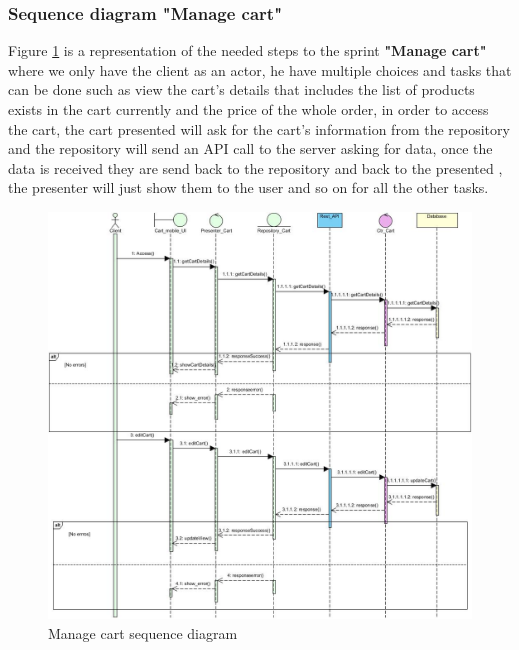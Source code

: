 \documentclass[12pt,a4paper]{report}
\begin{document}
\subsubsection*{Sequence diagram "Manage cart"}
Figure \ref{cart-sequence} is a representation of the needed steps to the sprint \textbf{"Manage cart"} where we only have the client as an actor, he have multiple choices and tasks that can be done such as view the cart's details that includes the list of products exists in the cart currently and the price of the whole order, in order to access the cart, the cart presented will ask for the cart's information from the repository and the repository will send an API call to the server asking for data, once the data is received they are send back to the repository and back to the presented , the presenter will just show them to the user and so on for all the other tasks.
\begin{figure}[H]
	\vspace*{1in}
	\centering
	\includegraphics[width=7in,keepaspectratio]{manageCartSeq.jpg}
	\caption{Manage cart sequence diagram}
	\label{cart-sequence}
\end{figure}
\clearpage
\end{document}
